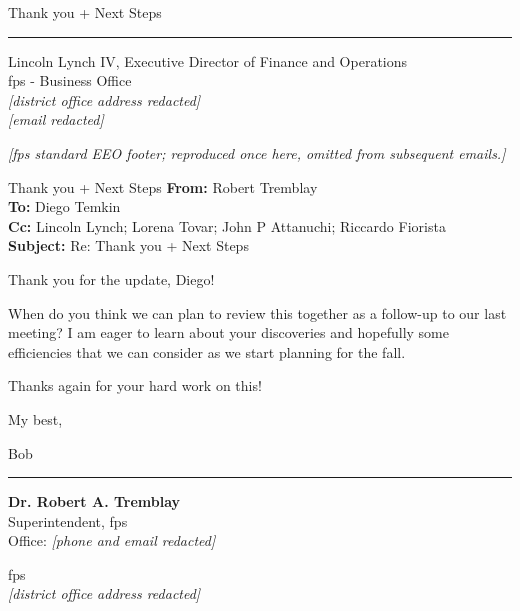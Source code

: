 {\begin{emailbox}{Thank you + Next Steps}
    \noindent\rule{\textwidth}{1pt}

    Lincoln Lynch IV, Executive Director of Finance and Operations \\
    \Acrlong{fps} - Business Office \\
    \textit{[district office address redacted]} \\
    \textit{[email redacted]} \vspace{1em}

    \textit{[\gls{fps} standard EEO footer; reproduced once here, omitted from subsequent emails.]}
\end{emailbox}

\begin{emailbox}{Thank you + Next Steps}
    \textbf{From:} Robert Tremblay \\
    \textbf{To:} Diego Temkin  \\
    \textbf{Cc:} Lincoln Lynch; Lorena Tovar; John P Attanuchi;  Riccardo Fiorista \\
    \textbf{Subject:} Re: Thank you + Next Steps

    \vspace{1em}
    Thank you for the update, Diego! \vspace{1em}

    When do you think we can plan to review this together as a follow-up to our last meeting? I am eager to learn about your discoveries and hopefully some efficiencies that we can consider as we start planning for the fall. \vspace{1em}

    Thanks again for your hard work on this! \vspace{1em}

    My best, \vspace{1em}

    Bob \vspace{1em}

    \noindent\rule{\textwidth}{1pt}

    \textbf{Dr. Robert A. Tremblay} \\
    Superintendent, \acrlong{fps} \\
    Office: \textit{[phone and email redacted]} \vspace{1em}
    
    \acrlong{fps} \\
    \textit{[district office address redacted]}
\end{emailbox}
}
